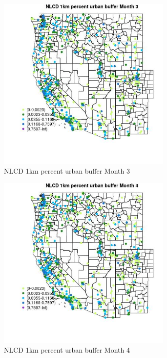 \begin{figure} 
\centering  
\includegraphics[width=0.77\textwidth]{Code_Outputs/Report_ML_input_PM25_Step4_part_f_de_duplicated_aves_prioritize_24hr_obswNAs_MapObsMo3NLCD_1km_percent_urban_buffer.jpg} 
\caption{\label{fig:Report_ML_input_PM25_Step4_part_f_de_duplicated_aves_prioritize_24hr_obswNAsMapObsMo3NLCD_1km_percent_urban_buffer}NLCD 1km percent urban buffer Month 3} 
\end{figure} 
 

\clearpage 

\begin{figure} 
\centering  
\includegraphics[width=0.77\textwidth]{Code_Outputs/Report_ML_input_PM25_Step4_part_f_de_duplicated_aves_prioritize_24hr_obswNAs_MapObsMo4NLCD_1km_percent_urban_buffer.jpg} 
\caption{\label{fig:Report_ML_input_PM25_Step4_part_f_de_duplicated_aves_prioritize_24hr_obswNAsMapObsMo4NLCD_1km_percent_urban_buffer}NLCD 1km percent urban buffer Month 4} 
\end{figure} 
 


